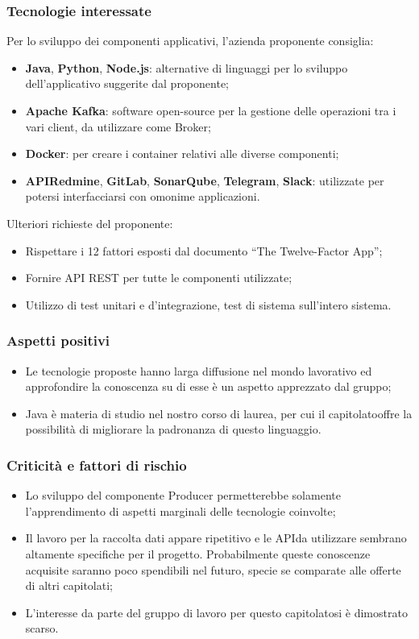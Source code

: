 \subsubsection{Tecnologie interessate}
Per lo sviluppo dei componenti applicativi, l'azienda proponente consiglia:
\begin{itemize}
	\item \textbf{Java}, \textbf{Python}\glo, \textbf{Node.js}\glo: alternative di linguaggi per lo sviluppo dell'applicativo suggerite dal proponente; 
	\item\textbf{Apache Kafka}\glo: software open-source per la gestione delle operazioni tra i vari client, da utilizzare come Broker;
	\item \textbf{Docker}\glo: per creare i container relativi alle diverse componenti;
	\item \textbf{API\glosp Redmine}\glo,  \textbf{GitLab}\glo,  \textbf{SonarQube}\glo,  \textbf{Telegram}\glo, \textbf{Slack}\glo: utilizzate per potersi interfacciarsi con omonime applicazioni.
\end{itemize}
Ulteriori richieste del proponente:
\begin{itemize}
	\item Rispettare i 12 fattori esposti dal documento “The Twelve-Factor App”;
	\item Fornire API REST per tutte le componenti utilizzate; 
	\item Utilizzo di test unitari e d’integrazione, test di sistema sull’intero sistema.
\end{itemize}
\subsubsection{Aspetti positivi}
\begin{itemize}
	\item Le tecnologie proposte hanno larga diffusione nel mondo lavorativo ed
	 approfondire la conoscenza su di esse è un aspetto apprezzato dal gruppo;
	\item Java è materia di studio nel nostro corso di laurea, per cui il
	 capitolato\glosp offre la possibilità di migliorare la padronanza di questo
	 linguaggio.
\end{itemize}
\subsubsection{Criticità e fattori di rischio}
\begin{itemize}
	\item Lo sviluppo del componente Producer permetterebbe solamente l'apprendimento di aspetti marginali delle tecnologie coinvolte;
	\item Il lavoro per la raccolta dati appare ripetitivo 
	 e le API\glosp da utilizzare sembrano altamente specifiche per il progetto. Probabilmente queste conoscenze acquisite saranno poco spendibili nel futuro, specie se comparate alle offerte di altri capitolati;
	\item L'interesse da parte del gruppo di lavoro per questo capitolato\glosp si è dimostrato scarso.
\end{itemize}
